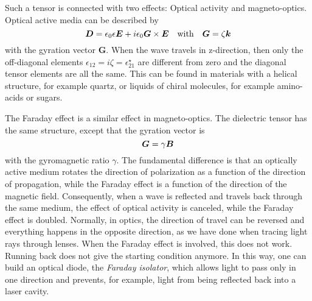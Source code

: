 Such a tensor is connected with two effects: Optical activity and magneto-optics. Optical active media can be described by 
\begin{equation}
    \boldsymbol{D} = \epsilon_0 \epsilon \boldsymbol{E} + i \epsilon_0 \boldsymbol{G} \times \boldsymbol{E} \quad \text{with} \quad \boldsymbol{G} = \zeta \boldsymbol{k}
\end{equation}
with the gyration vector $\boldsymbol{G}$. When the wave travels in z-direction, then only the off-diagonal elements $\epsilon_{12} = i \zeta = \epsilon_{21}^\star$ are different from zero and the diagonal tensor elements are all the same. This can be found in materials with a helical structure, for example quartz, or liquids of chiral molecules, for example amino-acids or sugars.


The Faraday effect is a similar effect in magneto-optics. The dielectric tensor has the same structure, except that the gyration vector is
\begin{equation}
    \boldsymbol{G} = \gamma \boldsymbol{B}
\end{equation}
with the gyromagnetic ratio $\gamma$. The fundamental difference is that an optically active medium rotates the direction of polarization as a function of the direction of propagation, while the Faraday effect is a function of the direction of the magnetic field. Consequently, when a wave is reflected and travels back through the same medium, the effect of optical activity is canceled, while the Faraday effect is doubled. Normally, in optics, the direction of travel can be reversed and everything happens in the opposite direction, as we have done when tracing light rays through lenses. When the Faraday effect is involved, this does not work. Running back does not give the starting condition anymore. In this way, one can build an optical diode, the \emph{Faraday isolator}, which allows light to pass only in one direction and prevents, for example, light from being reflected back into a laser cavity.




\printbibliography[segment=\therefsegment,heading=subbibliography]
